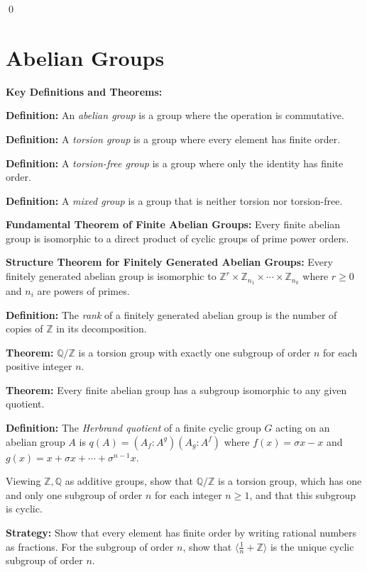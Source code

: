\qed
\section{Abelian Groups}

\textbf{Key Definitions and Theorems:}

\textbf{Definition:} An \textit{abelian group} is a group where the operation is commutative.

\textbf{Definition:} A \textit{torsion group} is a group where every element has finite order.

\textbf{Definition:} A \textit{torsion-free group} is a group where only the identity has finite order.

\textbf{Definition:} A \textit{mixed group} is a group that is neither torsion nor torsion-free.

\textbf{Fundamental Theorem of Finite Abelian Groups:} Every finite abelian group is isomorphic to a direct product of cyclic groups of prime power orders.

\textbf{Structure Theorem for Finitely Generated Abelian Groups:} Every finitely generated abelian group is isomorphic to $\mathbb{Z}^r \times \mathbb{Z}_{n_1} \times \cdots \times \mathbb{Z}_{n_k}$ where $r \geq 0$ and $n_i$ are powers of primes.

\textbf{Definition:} The \textit{rank} of a finitely generated abelian group is the number of copies of $\mathbb{Z}$ in its decomposition.

\textbf{Theorem:} $\mathbb{Q}/\mathbb{Z}$ is a torsion group with exactly one subgroup of order $n$ for each positive integer $n$.

\textbf{Theorem:} Every finite abelian group has a subgroup isomorphic to any given quotient.

\textbf{Definition:} The \textit{Herbrand quotient} of a finite cyclic group $G$ acting on an abelian group $A$ is $q(A) = (A_f : A^g)(A_g : A^f)$ where $f(x) = \sigma x - x$ and $g(x) = x + \sigma x + \cdots + \sigma^{n-1}x$.

\begin{problembox}
Viewing $\mathbb{Z}, \mathbb{Q}$ as additive groups, show that $\mathbb{Q}/\mathbb{Z}$ is a torsion group, which has one and only one subgroup of order $n$ for each integer $n \geq 1$, and that this subgroup is cyclic.
\end{problembox}

\noindent\textbf{Strategy:} Show that every element has finite order by writing rational numbers as fractions. For the subgroup of order $n$, show that $\langle \frac{1}{n} + \mathbb{Z} \rangle$ is the unique cyclic subgroup of order $n$.

